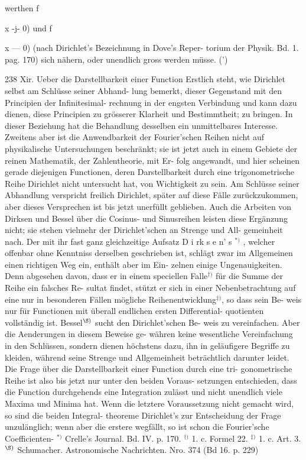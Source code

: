 \documentclass[12pt,a4paper]{book}
\theoremstyle{definition}
\theoremstyle{remark}
\begin{document}
werthen f{x  -j-  0)  und  f{x  ---  0)  (nach  Dirichlet's  Bezeichnung  in  Dove's  Reper-
torium  der  Physik.  Bd.  1.  pag.  170)  sich  nähern,  oder  unendlich  gross  werden
müsse.  (')
\newpage

238  Xir.    Ueber  die  Darstellbarkeit  einer  Function
Erstlich  steht,  wie  Dirichlet  selbst  am  Schlüsse  seiner  Abhand-
lung bemerkt,  dieser  Gegenstand  mit  den  Principien  der  Infinitesimal-
rechnung in  der  engsten  Verbindung  und  kann  dazu  dienen,  diese
Principien  zu  grösserer  Klarheit  und  Bestimmtheit;  zu  bringen.  In
dieser  Beziehung  hat  die  Behandlung  desselben  ein  unmittelbares
Interesse.
Zweitens  aber  ist  die  Anwendbarkeit  der  Fourier'schen  Reihen
nicht  auf  physikalische  Untersuchungen  beschränkt;  sie  ist  jetzt  auch
in  einem  Gebiete  der  reinen  Mathematik,  der  Zahlentheorie,  mit  Er-
folg angewandt,  und  hier  scheinen  gerade  diejenigen  Functionen,  deren
Darstellbarkeit  durch  eine  trigonometrische  Reihe  Dirichlet  nicht
untersucht  hat,  von  Wichtigkeit  zu  sein.
Am  Schlüsse  seiner  Abhandlung  verspricht  freilich  Dirichlet,
später  auf  diese  Fälle  zurückzukommen,  aber  dieses  Versprechen  ist
bis  jetzt  unerfüllt  geblieben.  Auch  die  Arbeiten  von  Dirksen  und
Bessel  über  die  Cosinus-  und  Sinusreihen  leisten  diese  Ergänzung
nicht;  sie  stehen  vielmehr  der  Dirichlet'schen  an  Strenge  und  All-
gemeinheit nach.  Der  mit  ihr  fast  ganz  gleichzeitige  Aufsatz  D  i rk  s  e n'  s  $^{*)}$ ,
welcher  offenbar  ohne  Kenntniss  derselben  geschrieben  ist,  schlägt
zwar  im  Allgemeinen  einen  richtigen  Weg  ein,  enthält  aber  im  Ein-
zelnen einige  Ungenauigkeiten.  Denn  abgesehen  davon,  dass  er  in
einem  speciellen  Falle$^{\dagger)}$  für  die  Summe  der  Reihe ein  falsches  Re-
sultat findet,  stützt  er  sich  in  einer  Nebenbetrachtung  auf  eine  nur  in
besonderen  Fällen  mögliche  Reihenentwicklung$^{\ddagger)}$,  so  dass  sein  Be-
weis nur  für  Functionen  mit  überall  endlichen  ersten  Differential-
quotienten vollständig  ist.  Bessel$^{\S)}$  sucht  den  Dirichlet'schen  Be-
weis zu  vereinfachen.  Aber  die  Aenderungen  in  diesem  Beweise  ge-
währen keine  wesentliche  Vereinfachung  in  den  Schlüssen,  sondern
dienen  höchstens  dazu,  ihn  in  geläufigere  Begriffe  zu  kleiden,  während
seine  Strenge  und  Allgemeinheit  beträchtlich  darunter  leidet.
Die  Frage  über  die  Darstellbarkeit  einer  Function  durch  eine  tri-
gonometrische Reihe  ist  also  bis  jetzt  nur  unter  den  beiden  Voraus-
setzungen entschieden,  dass  die  Function  durchgehends  eine  Integration
zulässt  und  nicht  unendlich  viele  Maxima  und  Minima  hat.  Wenn  die
letztere  Voraussetzung  nicht  gemacht  wird,  so  sind  die  beiden  Integral-
theoreme Dirichlet's  zur  Entscheidung  der  Frage  unzulänglich;  wenn
aber  die  erstere  wegfällt,  so  ist  schon  die  Fourier'sche  Coefficienten-
$^{*)}$  Crelle's  Journal.     Bd.  IV.  p.  170.
$^{\dagger)}$  1.  c.  Formel  22.
$^{\ddagger)}$  1.  c.  Art.  3.
$^{\S)}$  Schumacher.    Astronomische  Nachrichten.     Nro.  374  (Bd    16.  p.  229)
\newpage

}}
\end{document}
